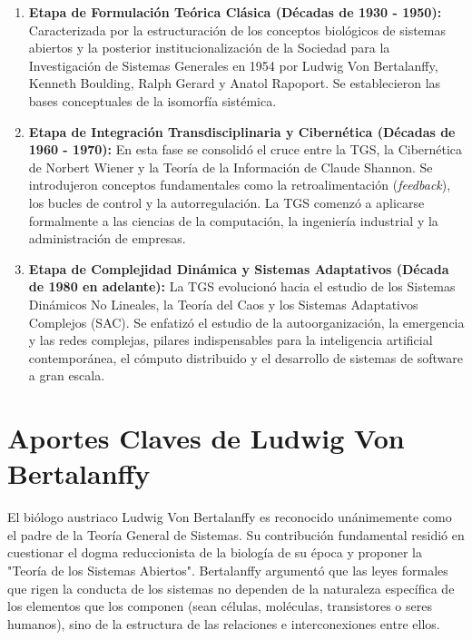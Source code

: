 \documentclass[12pt,letterpaper]{article}
\begin{document}
\begin{enumerate}[leftmargin=1.27cm, label=\arabic*.]
    \item \textbf{Etapa de Formulación Teórica Clásica (Décadas de 1930 - 1950):} Caracterizada por la estructuración de los conceptos biológicos de sistemas abiertos y la posterior institucionalización de la Sociedad para la Investigación de Sistemas Generales en 1954 por Ludwig Von Bertalanffy, Kenneth Boulding, Ralph Gerard y Anatol Rapoport. Se establecieron las bases conceptuales de la isomorfía sistémica.
    
    \item \textbf{Etapa de Integración Transdisciplinaria y Cibernética (Décadas de 1960 - 1970):} En esta fase se consolidó el cruce entre la TGS, la Cibernética de Norbert Wiener y la Teoría de la Información de Claude Shannon. Se introdujeron conceptos fundamentales como la retroalimentación (\textit{feedback}), los bucles de control y la autorregulación. La TGS comenzó a aplicarse formalmente a las ciencias de la computación, la ingeniería industrial y la administración de empresas.
    
    \item \textbf{Etapa de Complejidad Dinámica y Sistemas Adaptativos (Década de 1980 en adelante):} La TGS evolucionó hacia el estudio de los Sistemas Dinámicos No Lineales, la Teoría del Caos y los Sistemas Adaptativos Complejos (SAC). Se enfatizó el estudio de la autoorganización, la emergencia y las redes complejas, pilares indispensables para la inteligencia artificial contemporánea, el cómputo distribuido y el desarrollo de sistemas de software a gran escala.
\end{enumerate}

\section*{Aportes Claves de Ludwig Von Bertalanffy}

El biólogo austriaco Ludwig Von Bertalanffy es reconocido unánimemente como el padre de la Teoría General de Sistemas. Su contribución fundamental residió en cuestionar el dogma reduccionista de la biología de su época y proponer la "Teoría de los Sistemas Abiertos". Bertalanffy argumentó que las leyes formales que rigen la conducta de los sistemas no dependen de la naturaleza específica de los elementos que los componen (sean células, moléculas, transistores o seres humanos), sino de la estructura de las relaciones e interconexiones entre ellos.
\end{document}
